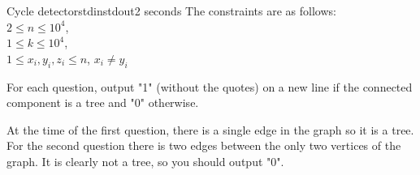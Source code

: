 \begin{problem}{Cycle detector}{stdin}{stdout}{2 seconds}
The constraints are as follows:\\
$2\le n \le 10^4$,\\ 
$1\le k \le 10^4$,\\ 
$1\le x_i,y_i,z_i \le n$, $x_i\not=y_i$ 

\OutputFile

For each question, output "1" (without the quotes) on a new line if the connected component is a tree and "0" otherwise.

\Example

\begin{examplewide}
%
\end{examplewide}

At the time of the first question, there is a single edge in the graph so it is a tree.\\
For the second question there is two edges between the only two vertices of the graph. It is clearly not a tree, so you should output "0".

\end{problem}

